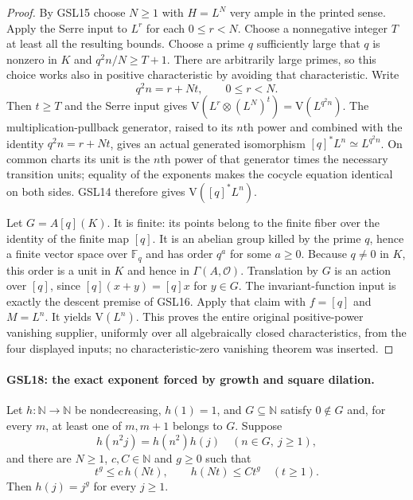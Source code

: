 \begin{proof}
By GSL15 choose $N\ge1$ with $H=L^N$ very ample in the printed
sense.  Apply the Serre input to $L^r$ for each
$0\le r<N$.  Choose a nonnegative integer $T$ at least all
the resulting bounds.  Choose a prime $q$ sufficiently large
that $q$ is nonzero in $K$ and $q^2n/N\ge T+1$.
There are arbitrarily large primes, so this choice works also
in positive characteristic by avoiding that characteristic.
Write
\[
 q^2n=r+Nt,\qquad 0\le r<N.
\]
Then $t\ge T$ and the Serre input gives
$\mathrm V(L^r\otimes(L^N)^t)=\mathrm V(L^{q^2n})$.
The multiplication-pullback generator, raised to its $n$th
power and combined with the identity $q^2n=r+Nt$, gives an
actual generated isomorphism
$[q]^*L^n\simeq L^{q^2n}$.  On common charts its unit is the
$n$th power of that generator times the necessary transition
units; equality of the exponents makes the cocycle equation
identical on both sides.  GSL14 therefore gives
$\mathrm V([q]^*L^n)$.

Let $G=A[q](K)$.  It is finite: its points belong to the finite
fiber over the identity of the finite map $[q]$.  It is an
abelian group killed by the prime $q$, hence a finite vector
space over $\mathbb F_q$ and has order $q^a$ for some $a\ge0$.
Because $q\ne0$ in $K$, this order is a unit in $K$ and hence
in $\Gamma(A,\mathcal O)$.  Translation by $G$ is an action
over $[q]$, since $[q](x+y)=[q]x$ for $y\in G$.
The invariant-function input is exactly the descent premise
of GSL16.  Apply that claim with $f=[q]$ and $M=L^n$.
It yields $\mathrm V(L^n)$.  This proves the entire original
positive-power vanishing supplier, uniformly over all
algebraically closed characteristics, from the four displayed
inputs; no characteristic-zero vanishing theorem was inserted.
\end{proof}

\paragraph{GSL18: the exact exponent forced by growth and square dilation.}
\label{claim:GSL18}
Let $h:\mathbb N\to\mathbb N$ be nondecreasing, $h(1)=1$, and
$G\subseteq\mathbb N$ satisfy $0\notin G$ and, for every $m$,
at least one of $m,m+1$ belongs to $G$.  Suppose
\[
 h(n^2j)=h(n^2)h(j)\quad(n\in G,\ j\ge1), \tag{GSL.9}
\]
and there are $N\ge1$, $c,C\in\mathbb N$ and $g\ge0$ such that
\[
 t^g\le c\,h(Nt),\qquad h(Nt)\le Ct^g\quad(t\ge1).
 \tag{GSL.10}
\]
Then $h(j)=j^g$ for every $j\ge1$.

